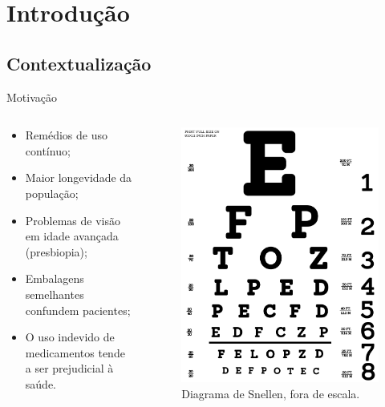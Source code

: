 \section{Introdução}

\subsection{Contextualização}

\begin{frame}{Motivação}
    \begin{columns}
        \begin{column}{0.5\textwidth}
            \begin{itemize}%
                \item Remédios de uso contínuo;
                \item Maior longevidade da população;
                \item Problemas de visão em idade avançada (presbiopia);
                \item Embalagens semelhantes confundem pacientes;
                \item O uso indevido de medicamentos tende a ser prejudicial à saúde.
            \end{itemize}
        \end{column}
        \begin{column}{0.5\textwidth}
            \begin{figure}
                \centering
                \caption*{Diagrama de Snellen, fora de escala.}
                \includegraphics[keepaspectratio, width=\linewidth, height=0.65\textheight]{../pictures/Snellen_chart.png}

\end{figure}
\end{column}
\end{columns}
\end{frame}
